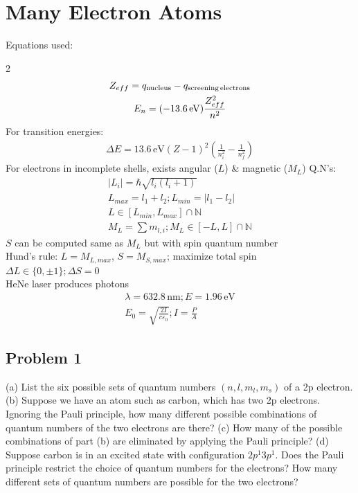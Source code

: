 \documentclass[12pt]{report}
\begin{document}
\chapter{Many Electron Atoms}
Equations used:
\begin{multicols}{2}
    \begin{gather}
        \label{eq:8.1}
        Z_{eff} = q_{\rm nucleus} - q_{\rm screening\,electrons}\\
        \label{eq:8.2}
        E_n = (-13.6\,\unit{\eV})\frac{Z_{eff}^2}{n^2}
    \end{gather}
    For transition energies:
    \begin{gather}
        \label{eq:8.3}
        \Delta E = 13.6\,\unit{\eV}(Z - 1)^2\left( \frac{1}{n_i^2} - \frac{1}{n_f^2} \right)
    \end{gather}
    For electrons in incomplete shells, exists angular ($L$) \& magnetic ($M_L$) Q.N's:
    \begin{gather}
        |L_i| = \hbar\sqrt{l_i(l_i + 1)}\\
        L_{max} = l_1 + l_2; 
        L_{min} = |l_1 - l_2|\\
        L \in [L_{min}, L_{max}] \cap \mathbb{N}\\
        M_L = \sum m_{l,i};
        M_L \in [-L, L] \cap \mathbb{N}
    \end{gather}
    $S$ can be computed same as $M_L$ but with spin quantum number\\
    Hund's rule: $L = M_{L, max}$, $S = M_{S, max}$; maximize total spin\\
    $\Delta L \in \{0, \pm 1\}; \Delta S = 0$\\
    HeNe laser produces photons
    \begin{gather}
        \lambda = 632.8\,\unit{\nano\meter}; E = 1.96\,\unit{\eV}\\
        E_0 = \sqrt{\frac{2I}{c\varepsilon_0}}; I = \frac{P}{A}
    \end{gather} 
\end{multicols}

\pagebreak
\section{Problem 1} %
(a) List the six possible sets of quantum numbers $(n, l, m_l, m_s)$ of a 2p electron. 
(b) Suppose we have an atom such as carbon, which has two 2p electrons. 
Ignoring the Pauli principle, how many different possible combinations of quantum numbers of the two electrons are there? 
(c) How many of the possible combinations of part (b) are eliminated by applying the Pauli principle? 
(d) Suppose carbon is in an excited state with conﬁguration $2p^1 3p^1$. 
Does the Pauli principle restrict the choice of quantum numbers for the electrons? 
How many different sets of quantum numbers are possible for the two electrons?
\end{document}
